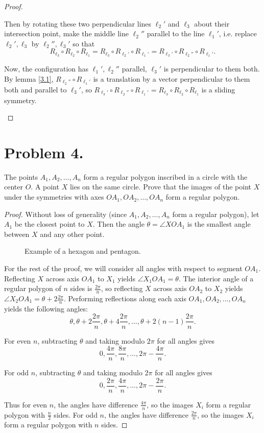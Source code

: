 \documentclass{article}
\begin{document}
\begin{proof}
\begin{enumerate}[label=(\arabic*)]
    \par Then by rotating these two perpendicular lines $\ell_2'$ and $\ell_3$ about their intersection point, make the middle line $\ell_2''$ parallel to the line $\ell_1'$, i.e. replace $\ell_2',\ell_3$ by $\ell_2'',\ell_3'$ so that 
    \[R_{\ell_3}\circ R_{\ell_2}\circ R_{\ell_1}=R_{\ell_3}\circ R_{\ell_2'}\circ R_{\ell_1'}=R_{\ell_3'}\circ R_{\ell_2''}\circ R_{\ell_1'}.\]
    \par Now, the configuration has $\ell_1', \ell_2''$ parallel, $\ell_3'$ is perpendicular to them both. By lemma \ref{3.1}, $R_{\ell_2''}\circ R_{\ell_1'}$ is a translation by a vector perpendicular to them both and parallel to $\ell_3'$, so $R_{\ell_3'}\circ R_{\ell_2''}\circ R_{\ell_1'}=R_{\ell_3}\circ R_{\ell_2}\circ R_{\ell_1}$ is a sliding symmetry.
\end{enumerate}
\end{proof}


\section{Problem 4.}
The points $A_1,A_2,\dots,A_n$ form a regular polygon inscribed in a circle with the center $O$. A point $X$ lies on the same circle. Prove that the images of the point $X$ under the symmetries with axes $OA_1,OA_2,\dots,OA_n$ form a regular polygon.
\begin{proof}
Without loss of generality (since $A_1,A_2,\dots,A_n$ form a regular polygon), let $A_1$ be the closest point to $X$. Then the angle $\theta=\angle XOA_1$ is the smallest angle between $X$ and any other point.

\begin{figure}[h]
    \centering
    
    \caption{Example of a hexagon and pentagon.}
\end{figure}

\par For the rest of the proof, we will consider all angles with respect to segment $OA_1$. Reflecting $X$ across axis $OA_1$ to $X_1$ yields $\angle X_1OA_1=\theta$. The interior angle of a regular polygon of $n$ sides is $\frac{2\pi}{n}$, so reflecting $X$ across axis $OA_2$ to $X_2$ yields $\angle X_2OA_1=\theta+2\frac{2\pi}{n}$. Performing reflections along each axis $OA_1,OA_2,\dots,OA_n$ yields the following angles: 
\[\theta, \theta+2\frac{2\pi}{n}, \theta+4\frac{2\pi}{n}, \dots, \theta+2(n-1)\frac{2\pi}{n}.\]
\par For even $n$, subtracting $\theta$ and taking modulo $2\pi$ for all angles gives \[0, \frac{4\pi}{n}, \frac{8\pi}{n}, \dots, 2\pi -\frac{4\pi}{n}.\]
\par For odd $n$, subtracting $\theta$ and taking modulo $2\pi$ for all angles gives \[0, \frac{2\pi}{n}, \frac{4\pi}{n}, \dots, 2\pi -\frac{2\pi}{n}.\]
\par Thus for even $n$, the angles have difference $\frac{4\pi}{n}$, so the images $X_i$ form a regular polygon with $\frac{n}{2}$ sides. For odd $n$, the angles have difference $\frac{2\pi}{n}$, so the images $X_i$ form a regular polygon with $n$ sides.
\end{proof}
\end{document}
